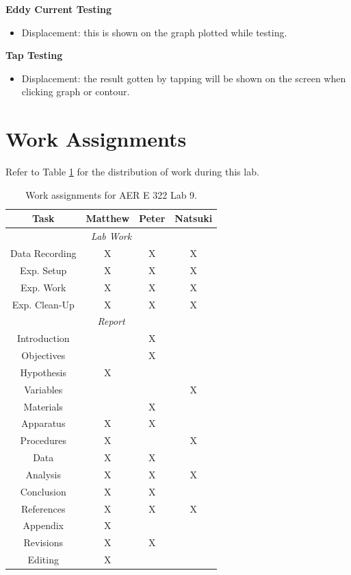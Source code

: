 \documentclass[12 pt]{report}
\begin{document}
\textbf{Eddy Current Testing}

\begin{itemize}
	\item Displacement: this is shown on the graph plotted while testing.
\end{itemize}

\textbf{Tap Testing}

\begin{itemize}
	\item Displacement: the result gotten by tapping will be shown on the screen when clicking graph or contour.
\end{itemize} 

\section{Work Assignments} \label{work_assignments}
Refer to Table \ref{tbl:work_assignments} for the distribution of work during this lab.

\begin{table}[!htbp]
\caption{Work assignments for AER E 322 Lab 9.}
\begin{center}
	\begin{tabular}{|c|c|c|c|}
		\hline
		\multicolumn{1}{|c|}{\textbf{Task}}&\textbf{Matthew}&\textbf{Peter}&\textbf{Natsuki}\\
		\hline
		\multicolumn{4}{|c|}{\textit{Lab Work}}\\
		\hline
		Data Recording&X&X&X\\
		\hline
		Exp. Setup&X&X&X\\
		\hline
		Exp. Work&X&X&X\\
		\hline
		Exp. Clean-Up&X&X&X\\
		\hline
		\multicolumn{4}{|c|}{\textit{Report}}\\
		\hline
		Introduction&&X&\\
		\hline
		Objectives&&X&\\
		\hline
		Hypothesis&X&&\\
		\hline
		Variables&&&X\\
		\hline
		Materials&&X&\\
		\hline
		Apparatus&X&X&\\
		\hline
		Procedures&X&&X\\
		\hline
		Data&X&X&\\
		\hline
		Analysis&X&X&X\\
		\hline
		Conclusion&X&X&\\
		\hline
		References&X&X&X\\
		\hline
		Appendix&X&&\\
		\hline
		Revisions&X&X&\\
		\hline
		Editing&X&&\\
		\hline
	\end{tabular}
\end{center}
\label{tbl:work_assignments}
\end{table}
\end{document}
